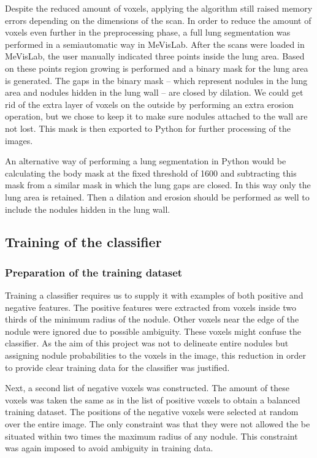 Despite the reduced amount of voxels, applying the algorithm still raised memory
errors depending on the dimensions of the scan. In order to reduce the amount of
voxels even further in the preprocessing phase, a full lung segmentation was
performed in a semiautomatic way in MeVisLab. After the scans were loaded in
MeVisLab, the user manually indicated three points inside the lung area. Based
on these points region growing is performed and a binary mask for the lung area
is generated. The gaps in the binary mask -- which represent nodules in the lung
area and nodules hidden in the lung wall -- are closed by dilation. We could get
rid of the extra layer of voxels on the outside by performing an extra erosion
operation, but we chose to keep it to make sure nodules attached to the wall are
not lost. This mask is then exported to Python for further processing of the
images.

An alternative way of performing a lung segmentation in Python would be
calculating the body mask at the fixed threshold of 1600 and subtracting this
mask from a similar mask in which the lung gaps are closed. In this way only the
lung area is retained. Then a dilation and erosion should be performed as well
to include the nodules hidden in the lung wall.

\subsection{Training of the classifier}
\subsubsection{Preparation of the training dataset}
Training a classifier requires us to supply it with examples of both positive
and negative features. The positive features were extracted from voxels inside
two thirds of the minimum radius of the nodule. Other voxels near the edge of
the nodule were ignored due to possible ambiguity. These voxels might confuse the
classifier. As the aim of this project was not to delineate entire nodules but
assigning nodule probabilities to the voxels in the image, this reduction in
order to provide clear training data for the classifier was justified.

Next, a second list of negative voxels was constructed. The amount of these
voxels was taken the same as in the list of positive voxels to obtain a balanced
training dataset. The positions of the negative voxels were selected at random
over the entire image. The only constraint was that they were not allowed the be
situated within two times the maximum radius of any nodule. This constraint was
again imposed to avoid ambiguity in training data.

